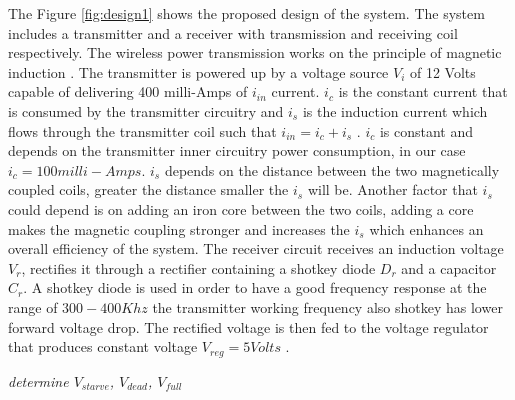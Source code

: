 The Figure \ref{fig:design1} shows the proposed design of the system. The system includes a transmitter and a receiver with transmission and receiving coil respectively. The wireless power transmission works on the principle of magnetic induction \cite{IAmp}. The transmitter is powered up by a voltage source $V_i$ of 12 Volts capable of delivering 400 milli-Amps of $i_{in}$ current. $i_c$ is the constant current that is consumed by the transmitter circuitry and $i_s$ is the induction current which flows through the transmitter coil such that $i_{in} = i_c + i_s$ . $i_c$ is constant and depends on the transmitter inner circuitry power consumption, in our case $i_c = 100 milli-Amps $. $i_s$ depends on the distance between the two magnetically coupled coils, greater the distance smaller the $i_s$ will be. Another factor that $i_s$ could depend is on adding an iron core between the two coils, adding a core makes the magnetic coupling stronger and increases the $i_s$ which enhances an overall efficiency of the system.
The receiver circuit receives an induction voltage $V_r$, rectifies it through a rectifier containing a shotkey diode $D_r$ and a capacitor $C_r$. A shotkey diode is used in order to have a good frequency response at the range of $ 300-400 Khz$ the transmitter working frequency also shotkey has lower forward voltage drop. The rectified voltage is then fed to the voltage regulator that produces constant voltage $V_{reg} = 5 Volts$ .

\emph {determine $V_{starve}$, $V_{dead}$, $V_{full}$}